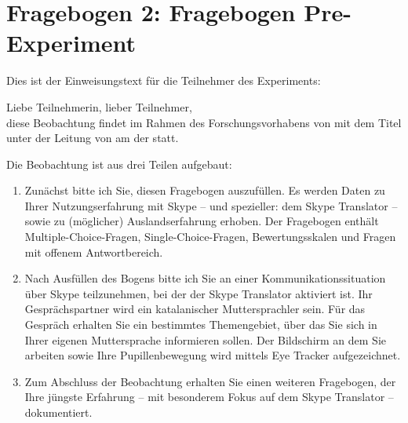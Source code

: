 
\chapter{Fragebogen 2: Fragebogen Pre-Experiment} %

\label{App:F2} %

% 
%

Dies ist der Einweisungstext für die Teilnehmer des Experiments:

\begin{framed}
\label{App2:EinweisungEva}

\noindent Liebe Teilnehmerin, lieber Teilnehmer,\\

\noindent diese Beobachtung findet im Rahmen des Forschungsvorhabens von \textit{\authorname} mit dem Titel \textit{\ttitle} unter der Leitung von \textit{\supname} am \textit{\deptname} der \textit{\univname} statt.

Die Beobachtung ist aus drei Teilen aufgebaut:

    \begin{enumerate}
        
    \item Zunächst bitte ich Sie, diesen Fragebogen auszufüllen. Es werden Daten zu Ihrer Nutzungserfahrung mit Skype – und spezieller: dem Skype Translator – sowie zu (möglicher) Auslandserfahrung erhoben. Der Fragebogen enthält Multiple-Choice-Fragen, Single-Choice-Fragen, Bewertungsskalen und Fragen mit offenem Antwortbereich.
    
    \item Nach Ausfüllen des Bogens bitte ich Sie an einer Kommunikationssituation über Skype teilzunehmen, bei der der Skype Translator aktiviert ist. Ihr Gesprächspartner wird ein katalanischer Muttersprachler sein. Für das Gespräch erhalten Sie ein bestimmtes Themengebiet, über das Sie sich in Ihrer eigenen Muttersprache informieren sollen. Der Bildschirm an dem Sie arbeiten sowie Ihre Pupillenbewegung wird mittels Eye Tracker aufgezeichnet.
    
    \item Zum Abschluss der Beobachtung erhalten Sie einen weiteren Fragebogen, der Ihre jüngste Erfahrung – mit besonderem Fokus auf dem Skype Translator – dokumentiert.\\

    \end{enumerate}
    

\end{framed}
